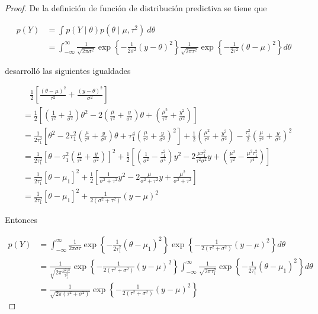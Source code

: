 \documentclass[
  10pt,
  spanish,
]{book}
\theoremstyle{definition}
\theoremstyle{definition}
\theoremstyle{definition}
\theoremstyle{definition}
\theoremstyle{remark}
\begin{document}
\begin{proof}
\iffalse{} {Prueba. } \fi{}De la definición de función de distribución predictiva se tiene que

\begin{align*}
p(Y)&=\int p(Y \mid \theta)p(\theta \mid \mu,\tau^2)\ d\theta\\
&=\int_{-\infty}^{\infty} \frac{1}{\sqrt{2\pi\sigma^2}}\exp\left\{-\frac{1}{2\sigma^2}(y-\theta)^2\right\}
\frac{1}{\sqrt{2\pi\tau^2}}\exp\left\{-\frac{1}{2\tau^2}(\theta-\mu)^2\right\}d\theta
\end{align*}

\citet{Berger} desarrolló las siguientes igualdades

\begin{align*}
&\ \ \ \ \frac{1}{2}\left[\frac{(\theta-\mu)^2}{\tau^2}+\frac{(y-\theta)^2}{\sigma^2}\right]\\
&=\frac{1}{2}\left[\left(\frac{1}{\tau^2}+\frac{1}{\sigma^2}\right)\theta^2-2\left(\frac{\mu}{\tau^2}+\frac{y}{\sigma^2}\right)\theta+\left(\frac{\mu^2}{\tau^2}+\frac{y^2}{\sigma^2}\right)\right]\\
&=\frac{1}{2\tau_1^2}\left[\theta^2-2\tau_1^2\left(\frac{\mu}{\tau^2}+\frac{y}{\sigma^2}\right)\theta+\tau_1^4\left(\frac{\mu}{\tau^2}+\frac{y}{\sigma^2}\right)^2\right]+\frac{1}{2}\left(\frac{\mu^2}{\tau^2}+\frac{y^2}{\sigma^2}\right)-\frac{\tau_1^2}{2}\left(\frac{\mu}{\tau^2}+\frac{y}{\sigma^2}\right)^2\\
&=\frac{1}{2\tau_1^2}\left[\theta-\tau_1^2\left(\frac{\mu}{\tau^2}+\frac{y}{\sigma^2}\right)\right]^2+\frac{1}{2}\left[\left(\frac{1}{\sigma^2}-\frac{\tau_1^2}{\sigma^4}\right)y^2-2\frac{\mu\tau_1^2}{\tau^2\sigma^2}y+\left(\frac{\mu^2}{\tau^2}-\frac{\mu^2\tau_1^2}{\tau^4}\right)\right]\\
&=\frac{1}{2\tau_1^2}\left[\theta-\mu_1\right]^2+\frac{1}{2}\left[\frac{1}{\sigma^2+\tau^2}y^2-2\frac{\mu}{\sigma^2+\tau^2}y+\frac{\mu^2}{\sigma^2+\tau^2}\right]\\
&=\frac{1}{2\tau_1^2}\left[\theta-\mu_1\right]^2+\frac{1}{2(\sigma^2+\tau^2)}(y-\mu)^2
\end{align*}

Entonces

\begin{align*}
p(Y)&=\int_{-\infty}^{\infty} \frac{1}{2\pi\sigma\tau}\exp\left\{-\frac{1}{2\tau_1^2}(\theta-\mu_1)^2\right\}
\exp\left\{-\frac{1}{2(\tau^2+\sigma^2)}(y-\mu)^2\right\}d\theta\\
&= \frac{1}{\sqrt{2\pi\frac{\sigma^2\tau^2}{\tau_1^2}}}\exp\left\{-\frac{1}{2(\tau^2+\sigma^2)}(y-\mu)^2\right\}
\int_{-\infty}^{\infty} \frac{1}{\sqrt{2\pi\tau_1^2}}\exp\left\{-\frac{1}{2\tau_1^2}(\theta-\mu_1)^2\right\}d\theta\\
&= \frac{1}{\sqrt{2\pi(\tau^2+\sigma^2)}}\exp\left\{-\frac{1}{2(\tau^2+\sigma^2)}(y-\mu)^2\right\}
\end{align*}
\end{proof}
\end{document}
